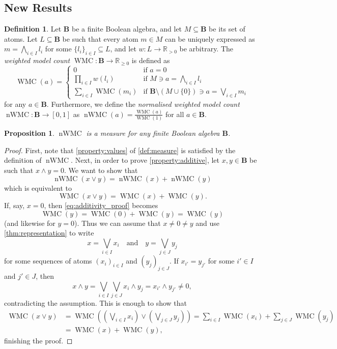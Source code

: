 \documentclass{article}
\newtheorem{proposition}{Proposition}
\theoremstyle{definition}
\newtheorem{definition}{Definition}
\theoremstyle{remark}
\DeclareMathOperator{\WMC}{WMC}
\DeclareMathOperator{\nWMC}{nWMC}
\begin{document}
\subsection{New Results}

\begin{definition} \label{def:wmc}
  Let $\mathbf{B}$ be a finite Boolean algebra, and let $M \subseteq \mathbf{B}$
  be its set of atoms. Let $L \subseteq \mathbf{B}$ be such that every atom $m
  \in M$ can be uniquely expressed as $m = \bigwedge_{i \in I} l_i$ for some $\{
  l_i \}_{i \in I} \subseteq L$, and let $w : L \to \mathbb{R}_{>0}$ be
  arbitrary. The \emph{weighted model count} $\WMC : \mathbf{B} \to
  \mathbb{R}_{\ge 0}$ is defined as
  \[
    \WMC(a) = \begin{cases}
      0 & \text{if } a = 0 \\
      \prod_{i \in I} w(l_i) & \text{if } M \ni a = \bigwedge_{i \in I} l_i \\
      \sum_{i \in I} \WMC(m_i) & \text{if } \mathbf{B} \setminus (M \cup \{ 0
      \}) \ni a = \bigvee_{i \in I} m_i
    \end{cases}
  \]
  for any $a \in \mathbf{B}$. Furthermore, we define the \emph{normalised
    weighted model count} $\nWMC : \mathbf{B} \to [0, 1]$ as $\nWMC(a) =
  \frac{\WMC(a)}{\WMC(1)}$ for all $a \in \mathbf{B}$.
\end{definition}

\begin{proposition}
  $\nWMC$ is a measure for any finite Boolean algebra $\mathbf{B}$.
\end{proposition}
\begin{proof}
  First, note that \cref{property:values} of \cref{def:measure} is satisfied by
  the definition of $\nWMC$. Next, in order to prove \cref{property:additive},
  let $x, y \in \mathbf{B}$ be such that $x \land y = 0$. We want to show that
  \[
    \nWMC(x \lor y) = \nWMC(x) + \nWMC(y)
  \]
  which is equivalent to
  \begin{equation} \label{eq:additivity_proof}
    \WMC(x \lor y) = \WMC(x) + \WMC(y).
  \end{equation}
  If, say, $x = 0$, then \cref{eq:additivity_proof} becomes
  \[
    \WMC(y) = \WMC(0) + \WMC(y) = \WMC(y)
  \]
  (and likewise for $y = 0$). Thus we can assume that $x \ne 0 \ne y$ and use
  \cref{thm:representation} to write
  \[
    x = \bigvee_{i \in I} x_i \quad \text{and} \quad y = \bigvee_{j \in J} y_j
  \]
  for some sequences of atoms $(x_i)_{i \in I}$ and $(y_j)_{j \in J}$. If
  $x_{i'} = y_{j'}$ for some $i' \in I$ and $j' \in J$, then
  \[
    x \land y = \bigvee_{i \in I} \bigvee_{j \in J} x_i \land y_j = x_{i'} \land
    y_{j'} \ne 0,
  \]
  contradicting the assumption. This is enough to show that
  \begin{align*}
    \WMC(x \lor y) &= \WMC\left( \left( \bigvee_{i \in I} x_i \right) \lor \left(\bigvee_{j \in J} y_j \right) \right) = \sum_{i \in I} \WMC(x_i) + \sum_{j \in J} \WMC(y_j) \\
                   &= \WMC(x) + \WMC(y),
  \end{align*}
  finishing the proof.
\end{proof}
\end{document}
